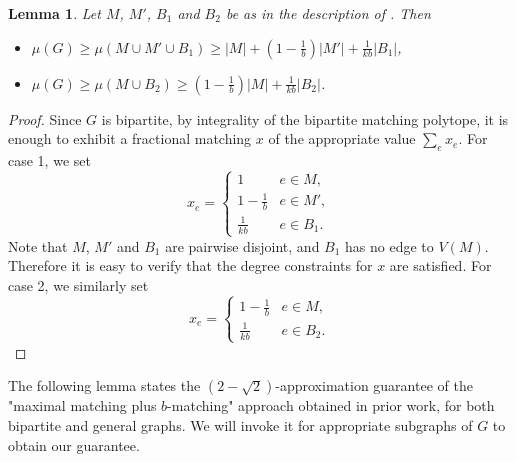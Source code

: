 \documentclass[letterpaper,11pt]{article}
\newtheorem{lemma}{Lemma}[section]
\begin{document}
\begin{lemma} \label{lem:fractional_matching}
    Let $M$, $M'$, $B_1$ and $B_2$ be as in the description of . Then
    \begin{itemize}
        \item $\mu(G) \ge \mu(M \cup M' \cup B_1) \ge |M| + (1 - \frac{1}{b}) |M'| + \frac{1}{kb} |B_1|$,
        \item $\mu(G) \ge \mu(M \cup B_2) \ge (1 - \frac{1}{b}) |M| + \frac{1}{kb} |B_2|$.
    \end{itemize}
\end{lemma}
\begin{proof}
    Since $G$ is bipartite,
    by integrality of the bipartite matching polytope,
    it is enough to exhibit a fractional matching $x$ of the appropriate value $\sum_e x_e$. For case 1, we set
    \[
    x_e = \begin{cases}
        1 & e \in M, \\
        1 - \frac{1}{b} & e \in M', \\
        \frac{1}{kb} & e \in B_1.
    \end{cases}
    \]
    Note that $M$, $M'$ and $B_1$ are pairwise disjoint, and $B_1$ has no edge to $V(M)$. Therefore it is easy to verify that the degree constraints for $x$ are satisfied.
    For case 2, we similarly set
    \[
    x_e = \begin{cases}
        1 - \frac{1}{b} & e \in M, \\
        \frac{1}{kb} & e \in B_2.
    \end{cases}\]\end{proof}


\newcommand{\mo}{\ensuremath{|M_1^*|}}
\newcommand{\mop}{\ensuremath{|M_1^{'*}|}}
\newcommand{\mt}{\ensuremath{|M_2^{*}|}}
\newcommand{\mtp}{\ensuremath{|M_2^{'*}|}}
\newcommand{\mtpp}{\ensuremath{|M_2^{''*}|}}

The following lemma states the $(2-\sqrt{2})$-approximation guarantee
of the "maximal matching plus $b$-matching" approach
obtained in prior work,
for both bipartite and general graphs.
We will invoke it for appropriate subgraphs of $G$
to obtain our guarantee.
\end{document}

